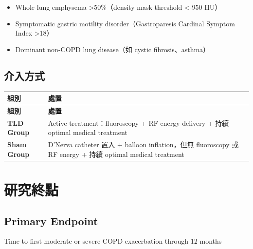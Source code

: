 \documentclass[12pt,a4paper]{article}
\begin{document}
\begin{itemize}
    \item Whole-lung emphysema >50\%（density mask threshold <-950 HU）
    \item Symptomatic gastric motility disorder（Gastroparesis Cardinal Symptom Index >18）
    \item Dominant non-COPD lung disease（如 cystic fibrosis、asthma）
\end{itemize}

\subsection{介入方式}

\begin{longtable}{p{4cm}p{10cm}}
\toprule
\textbf{組別} & \textbf{處置} \\
\midrule
\endfirsthead

\toprule
\textbf{組別} & \textbf{處置} \\
\midrule
\endhead

\bottomrule
\endfoot

\textbf{TLD Group} & Active treatment：fluoroscopy + RF energy delivery + 持續 optimal medical treatment \\
\midrule
\textbf{Sham Group} & D'Nerva catheter 置入 + balloon inflation，但無 fluoroscopy 或 RF energy + 持續 optimal medical treatment \\
\bottomrule
\end{longtable}

\section{研究終點}

\subsection{Primary Endpoint}

Time to first moderate or severe COPD exacerbation through 12 months

\end{document}
